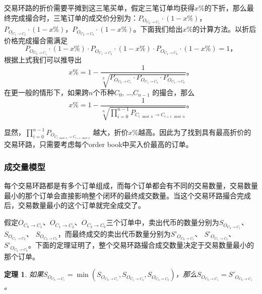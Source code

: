 \documentclass[UTF8,nofonts]{ctexart}
\newtheorem{theorem}{定理}[section]
\begin{document}
交易环路的折价需要平摊到这三笔买单，假定三笔订单均获得$x\%$的下折，那么最终完成撮合时，三笔订单的成交价分别为：$P_{O_{C_{0} \rightarrow C_{1}}}\cdot (1-x\%)$，$P_{O_{C_{1} \rightarrow C_{2}}}\cdot (1-x\%)$，$P_{O_{C_{2} \rightarrow C_{0}}}\cdot (1-x\%)$。下面我们给出$x\%$的计算方法。以折后价格完成撮合需满足
\begin{equation}\label{match}
P_{O_{C_{0} \rightarrow C_{1}}}\cdot (1-x\%)\cdot P_{O_{C_{1} \rightarrow C_{2}}}\cdot (1-x\%)\cdot P_{O_{C_{2} \rightarrow C_{0}}}\cdot (1-x\%) = 1\text{，}
\end{equation}
根据上式我们可以推导出
\begin{equation*}
x\%= 1- \frac{1}{\sqrt[3]{P_{O_{C_{0} \rightarrow C_{1}}}\cdot P_{O_{C_{1} \rightarrow C_{2}}}\cdot P_{O_{C_{2} \rightarrow C_{0}}}}}\text{。}
\end{equation*}
在更一般的情形下，如果跨$n$个币种$C_{0}$, …,$C_{n-1}$ 的撮合，那么
\begin{equation*}
x\%= 1- \frac{1}{\sqrt[n]{\prod_{i=0}^{n-1} P_{C_{i\mod n} \rightarrow C_{i+1\mod n}}}}\text{。}
\end{equation*}

显然，$\prod_{i=0}^{n-1} P_{O_{C_{i\mod n} \rightarrow C_{i+1\mod n}}}$ 越大，折价$x\%$越高。因此为了找到具有最高折价的交易环路，只需要考虑每个order book中买入价最高的订单。


\subsubsection{成交量模型}
每个交易环路都是有多个订单组成，而每个订单都会有不同的交易数量，交易数量最小的那个订单会直接影响整个闭环的最终成交数量。当这个交易环路撮合完成后，交易数量最小的这个订单就完全成交了。

假定$O_{C_{0} \rightarrow C_{1}}$、$O_{C_{1} \rightarrow C_{2}}$、$O_{C_{2} \rightarrow C_{0}}$三个订单中，卖出代币的数量分别为$S_{O_{C_{0}\rightarrow C_{1}}}$、 $S_{O_{C_{1}\rightarrow C_{2}}}$、 $S_{O_{C_{2}\rightarrow C_{0}}}$，而最终成交的卖出代币数量分别为$S’_{O_{C_{0}\rightarrow C_{1}}}$、 $S’_{O_{C_{1}\rightarrow C_{2}}}$、 $S’_{O_{C_{2}\rightarrow C_{0}}}$。下面的定理证明了，整个交易环路撮合成交数量决定于交易数量最小的那个订单。


\begin{theorem}
如果$S_{O_{C_{0}\rightarrow C_{1}}} = \min( {S_{O_{C_{0}\rightarrow C_{1}}},S_{O_{C_{1}\rightarrow C_{2}}},S_{O_{C_{2}\rightarrow C_{0}}}})$，那么$S_{O_{C_{0}\rightarrow C_{1}}} = S'_{O_{C_{0}\rightarrow C_{1}}}$。
\end{theorem}
\end{document}
